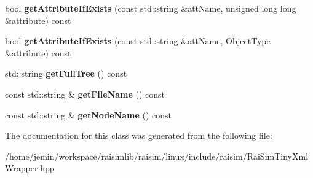 \begin{DoxyCompactItemize}
\mbox{\label{classraisim_1_1RaiSimTinyXmlWrapper_a1c7e4dc93fbfe27a78a0c83d9eafa3fc}} 
bool {\bfseries get\+Attribute\+If\+Exists} (const std\+::string \&att\+Name, unsigned long long \&attribute) const
\item 
\mbox{\label{classraisim_1_1RaiSimTinyXmlWrapper_a1fb0cb2088442adbbb04b38bc794f6ee}} 
bool {\bfseries get\+Attribute\+If\+Exists} (const std\+::string \&att\+Name, Object\+Type \&attribute) const
\item 
\mbox{\label{classraisim_1_1RaiSimTinyXmlWrapper_a9e779457edcc09734c328a612d28ab87}} 
std\+::string {\bfseries get\+Full\+Tree} () const
\item 
\mbox{\label{classraisim_1_1RaiSimTinyXmlWrapper_a7cb555889288862b95b86009717be111}} 
const std\+::string \& {\bfseries get\+File\+Name} () const
\item 
\mbox{\label{classraisim_1_1RaiSimTinyXmlWrapper_a8c1d8f55cd75920a9a42631f899006cb}} 
const std\+::string \& {\bfseries get\+Node\+Name} () const
\end{DoxyCompactItemize}


The documentation for this class was generated from the following file\+:\begin{DoxyCompactItemize}
\item 
/home/jemin/workspace/raisimlib/raisim/linux/include/raisim/Rai\+Sim\+Tiny\+Xml\+Wrapper.\+hpp\end{DoxyCompactItemize}
